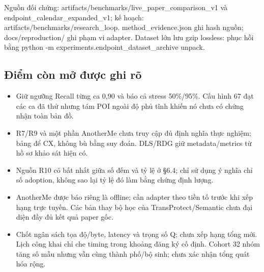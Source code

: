 \documentclass[10pt,a4paper]{article}
\begin{document}
Nguồn đối chứng: artifacts/benchmarks/live\_\allowbreak{}paper\_\allowbreak{}comparison\_\allowbreak{}v1 và endpoint\_\allowbreak{}calendar\_\allowbreak{}expanded\_\allowbreak{}v1; kế hoạch: artifacts/benchmarks/research\_\allowbreak{}loop. method\_\allowbreak{}evidence.json ghi hash nguồn; docs/reproduction/ ghi phạm vi adapter. Dataset lớn lưu gzip lossless: phục hồi bằng python -m experiments.endpoint\_\allowbreak{}dataset\_\allowbreak{}archive unpack.

\subsection{Điểm còn mở được ghi rõ}
\begin{itemize}
\item Giữ ngưỡng Recall từng ca 0,90 và báo cả stress 50\%/95\%. Cấu hình 67 đạt các ca đã thử nhưng tám POI ngoài độ phủ tĩnh khiến nó chưa có chứng nhận toàn bản đồ.
\item R7/R9 và một phần AnotherMe chưa truy cập đủ định nghĩa thực nghiệm; bảng để CX, không bù bằng suy đoán. DLS/RDG giữ metadata/metrics từ hồ sơ khảo sát hiện có.
\item Nguồn R10 có bất nhất giữa số đếm và tỷ lệ ở §6.4; chỉ sử dụng ý nghĩa chỉ số adoption, không sao lại tỷ lệ đó làm bằng chứng định lượng.
\item AnotherMe được báo riêng là offline; cần adapter theo tiền tố trước khi xếp hạng trực tuyến. Các bản thay bộ học của TransProtect/Semantic chưa đại diện đầy đủ kết quả paper gốc.
\item Chốt ngân sách tọa độ/byte, latency và trọng số Q; chưa xếp hạng tổng mới. Lịch công khai chỉ che timing trong khoảng đăng ký cố định. Cohort 32 nhóm tăng số mẫu nhưng vẫn cùng thành phố/bộ sinh; chưa xác nhận tổng quát hóa rộng.
\end{itemize}

\clearpage
\end{document}
